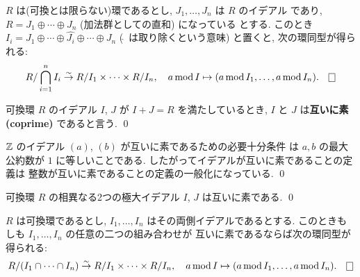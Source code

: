 \documentclass[12pt,twoside]{jarticle}
\begin{document}
\begin{question}
 $R$ は(可換とは限らない)環であるとし, $J_1,\ldots,J_n$ は $R$ のイデアル
 であり, $R=J_1\oplus\cdots\oplus J_n$ (加法群としての直和) になっている
 とする. このとき $I_i = J_1\oplus\cdots\oplus\widehat{J_i}\oplus\cdots\oplus J_n$
 ($\widehat{\ }$ は取り除くという意味) と置くと, 次の環同型が得られる:
 \begin{equation*}
  R/\bigcap_{i=1}^n I_i \isomto R/I_1\times\cdots\times R/I_n,
  \quad
  a\MOD I \mapsto (a\MOD I_1,\ldots,a\MOD I_n).
  \qed
 \end{equation*}
\end{question}

\begin{definition}[互いに素]
 可換環 $R$ のイデアル $I$, $J$ が $I+J=R$ を満たしているとき, 
 $I$ と $J$ は{\bf 互いに素 (coprime)} であると言う.
 \qed
\end{definition}

\begin{question}[易しい]
 ${\mathbb Z}$ のイデアル $(a)$, $(b)$ が互いに素であるための必要十分条件
 は $a,b$ の最大公約数が $1$ に等しいことである. 
 したがってイデアルが互いに素であることの定義は
 整数が互いに素であることの定義の一般化になっている.
 \qed
\end{question}

\begin{question}[易しい]
 可換環 $R$ の相異なる2つの極大イデアル $I$, $J$ は互いに素である. \qed
\end{question}

\begin{question}
 $R$ は可換環であるとし, 
 $I_1,\ldots,I_n$ はその両側イデアルであるとする.
 このときもしも $I_1,\ldots,I_n$ の任意の二つの組み合わせが
 互いに素であるならば次の環同型が得られる:
 \begin{equation*}
  R/(I_1\cap\cdots\cap I_n) \isomto R/I_1\times\cdots\times R/I_n,
  \quad
  a\MOD I \mapsto (a\MOD I_1,\ldots,a\MOD I_n).
  \qed
 \end{equation*}
\end{question}
\end{document}
